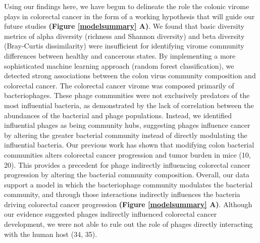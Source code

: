 \documentclass[12pt,]{article}
\begin{document}
Using our findings here, we have begun to delineate the role the colonic
virome plays in colorectal cancer in the form of a working hypothesis
that will guide our future studies \textbf{(Figure \ref{modelsummary}
A)}. We found that basic diversity metrics of alpha diversity (richness
and Shannon diversity) and beta diversity (Bray-Curtis dissimilarity)
were insufficient for identifying virome community differences between
healthy and cancerous states. By implementing a more sophisticated
machine learning approach (random forest classification), we detected
strong associations between the colon virus community composition and
colorectal cancer. The colorectal cancer virome was composed primarily
of bacteriophages. These phage communities were not exclusively
predators of the most influential bacteria, as demonstrated by the lack
of correlation between the abundances of the bacterial and phage
populations. Instead, we identified influential phages as being
community hubs, suggesting phages influence cancer by altering the
greater bacterial community instead of directly modulating the
influential bacteria. Our previous work has shown that modifying colon
bacterial communities alters colorectal cancer progression and tumor
burden in mice (10, 20). This provides a precedent for phage indirectly
influencing colorectal cancer progression by altering the bacterial
community composition. Overall, our data support a model in which the
bacteriophage community modulates the bacterial community, and through
those interactions indirectly influences the bacteria driving colorectal
cancer progression \textbf{(Figure \ref{modelsummary} A)}. Although our
evidence suggested phages indirectly influenced colorectal cancer
development, we were not able to rule out the role of phages directly
interacting with the human host (34, 35).
\end{document}
